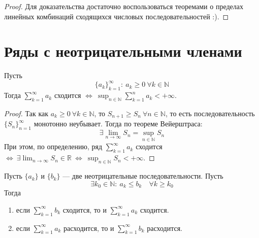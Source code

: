 \documentclass[11pt]{article}
\begin{document}
\begin{proof}
    Для доказательства достаточно воспользоваться теоремами о пределах линейных комбинаций 
    сходящихся числовых последовательностей :).
\end{proof}

\section{Ряды с неотрицательными членами}

\begin{theorem}  \label{theorem:3.1}
    \mbox{} Пусть \[\{a_k\}_{k = 1}^{\infty}: \ a_k \geq 0 \ \forall k \in \mathbb{N}\]
    Тогда $\displaystyle \sum_{k = 1}^{\infty} a_k \text{ сходится } \Longleftrightarrow
    \ \sup_{n \in \mathbb{N}} \sum_{k = 1}^{n} a_k < +\infty$.
\end{theorem}

\begin{proof}
    Так как $a_k \geq 0 \ \forall k \in \mathbb{N}$, то $S_{n + 1} \geq S_n \ \forall n \in \mathbb{N}$, 
    то есть последовательность $\{S_n\}_{n = 1}^{\infty}$ монотонно неубывает. Тогда по теореме
    Вейерштраса: \[\exists \lim_{n \to \infty} S_n = \sup_{n \in \mathbb{N}} S_n\]
    При этом, по определению, ряд $\displaystyle \sum_{k = 1}^{\infty} a_k$ сходится 
    $\displaystyle \Longleftrightarrow \ \exists \lim_{n \to \infty} S_n \in \mathbb{R} \ \Longleftrightarrow
    \ \sup_{n \in \mathbb{N}} S_n < +\infty$.
\end{proof}

\begin{theorem}
    Пусть $\{a_k\}$ и $\{b_k\}$ --- две неотрицательные последовательности. Пусть 
    \[\exists k_0 \in \mathbb{N}: \ a_k \leq b_k \quad \forall k \geq k_0\] Тогда 
    \begin{enumerate}
        \item если $\displaystyle \sum_{k = 1}^{\infty} b_k$ сходится, то и 
        $\displaystyle \sum_{k = 1}^{\infty} a_k$ сходится.
        \item если $\displaystyle \sum_{k = 1}^{\infty} a_k$ расходится, то и 
        $\displaystyle \sum_{k = 1}^{\infty} b_k$ расходится.
    \end{enumerate}
\end{theorem}
\end{document}
